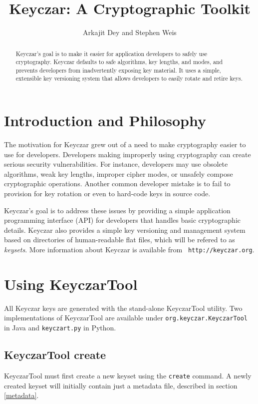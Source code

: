 \documentclass{llncs}
\title{Keyczar: A Cryptographic Toolkit}
\author{Arkajit Dey\inst{1} and Stephen Weis\inst{2}}
\institute{Massachusetts Institute of Technology, Cambridge, MA, USA 02139
\and
Google Inc., Mountain View, CA, USA 94043}
\begin{document}
\maketitle

\begin{abstract}
Keyczar's goal is to make it easier for application developers to safely use
cryptography. Keyczar defaults to safe algorithms, key lengths, and
modes, and prevents developers from inadvertently exposing key material. It
uses a simple, extensible key versioning system that allows developers to
easily rotate and retire keys.
\end{abstract}

\section{Introduction and Philosophy}

The motivation for Keyczar grew out of a need to make cryptography easier to
use for developers. Developers making improperly using cryptography can create
serious security vulnerabilities. For instance, developers may use obsolete
algorithms, weak key lengths, improper cipher modes, or unsafely compose
cryptographic operations. Another common developer mistake is to fail to
provision for key rotation or even to hard-code keys in source code.

Keyczar's goal is to address these issues by providing a simple application
programming interface (API) for developers that handles basic cryptographic
details. Keyczar also provides a simple key versioning and management system
based on directories of human-readable flat files, which will be refered to as
\emph{keysets}. More information about Keyczar is available from {\tt
http://keyczar.org}.

\section{Using KeyczarTool}\label{keytool}

All Keyczar keys are generated with the stand-alone 
KeyczarTool utility. Two implementations of KeyczarTool are available under
{\tt org.keyczar.KeyczarTool} in Java and {\tt keyczart.py} in Python.

\subsection{KeyczarTool create}
KeyczarTool must first create a new keyset using the {\tt create} command. A
newly created keyset will initially contain just a metadata file, described in
section \ref{metadata}.
\end{document}
